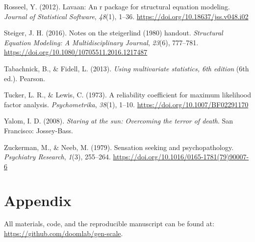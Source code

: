 \documentclass[
  english,
  man]{apa6}
\newlength{\cslhangindent}
\newenvironment{CSLReferences}[2] %
 {\begin{list}{}{%
  \setlength{\itemindent}{0pt}
  \setlength{\leftmargin}{0pt}
  \setlength{\parsep}{0pt}
  \ifodd #1
   \setlength{\leftmargin}{\cslhangindent}
   \setlength{\itemindent}{-1\cslhangindent}
  \fi
  \setlength{\itemsep}{#2\baselineskip}}}
 {\end{list}}
\begin{document}
\begin{CSLReferences}{1}{0}
Rosseel, Y. (2012). Lavaan: An r package for structural equation modeling. \emph{Journal of Statistical Software}, \emph{48}(1), 1--36. \url{https://doi.org/10.18637/jss.v048.i02}

Steiger, J. H. (2016). Notes on the steiger{\textendash}lind (1980) handout. \emph{Structural Equation Modeling: A Multidisciplinary Journal}, \emph{23}(6), 777--781. \url{https://doi.org/10.1080/10705511.2016.1217487}

Tabachnick, B., \& Fidell, L. (2013). \emph{Using multivariate statistics, 6th edition} (6th ed.). Pearson.

Tucker, L. R., \& Lewis, C. (1973). A reliability coefficient for maximum likelihood factor analysis. \emph{Psychometrika}, \emph{38}(1), 1--10. \url{https://doi.org/10.1007/BF02291170}

Yalom, I. D. (2008). \emph{Staring at the sun: Overcoming the terror of death}. San Francisco: Jossey-Bass.

Zuckerman, M., \& Neeb, M. (1979). Sensation seeking and psychopathology. \emph{Psychiatry Research}, \emph{1}(3), 255--264. \url{https://doi.org/10.1016/0165-1781(79)90007-6}

\end{CSLReferences}

\section{Appendix}\label{appendix}

All materials, code, and the reproducible manuscript can be found at: \url{https://github.com/doomlab/gen-scale}.
\end{document}
